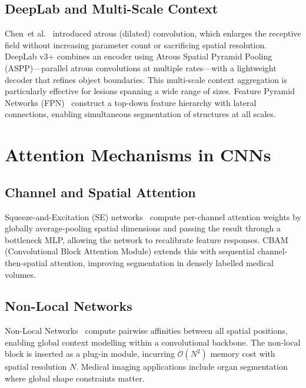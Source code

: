 \documentclass[preprint,12pt,authoryear]{elsarticle}
\begin{document}
\subsection{DeepLab and Multi-Scale Context}
\label{sec:deeplab}

Chen~et al.~\citep{chen2018deeplab} introduced atrous (dilated) convolution,
which enlarges the receptive field without increasing parameter count or
sacrificing spatial resolution. DeepLab v3+ combines an encoder using Atrous
Spatial Pyramid Pooling (ASPP)---parallel atrous convolutions at multiple
rates---with a lightweight decoder that refines object boundaries. This
multi-scale context aggregation is particularly effective for lesions spanning
a wide range of sizes. Feature Pyramid Networks (FPN)~\citep{lin2017fpn}
construct a top-down feature hierarchy with lateral connections, enabling
simultaneous segmentation of structures at all scales.

\section{Attention Mechanisms in CNNs}
\label{sec:attention}

\subsection{Channel and Spatial Attention}
\label{sec:channel_spatial}

Squeeze-and-Excitation (SE) networks~\citep{hu2018senet} compute per-channel
attention weights by globally average-pooling spatial dimensions and passing
the result through a bottleneck MLP, allowing the network to recalibrate
feature responses. CBAM (Convolutional Block Attention Module) extends this with
sequential channel-then-spatial attention, improving segmentation in densely
labelled medical volumes.

\subsection{Non-Local Networks}
\label{sec:nonlocal}

Non-Local Networks~\citep{wang2018nonlocal} compute pairwise affinities between
all spatial positions, enabling global context modelling within a convolutional
backbone. The non-local block is inserted as a plug-in module, incurring
$\mathcal{O}(N^2)$ memory cost with spatial resolution $N$. Medical imaging
applications include organ segmentation where global shape constraints matter.
\end{document}
